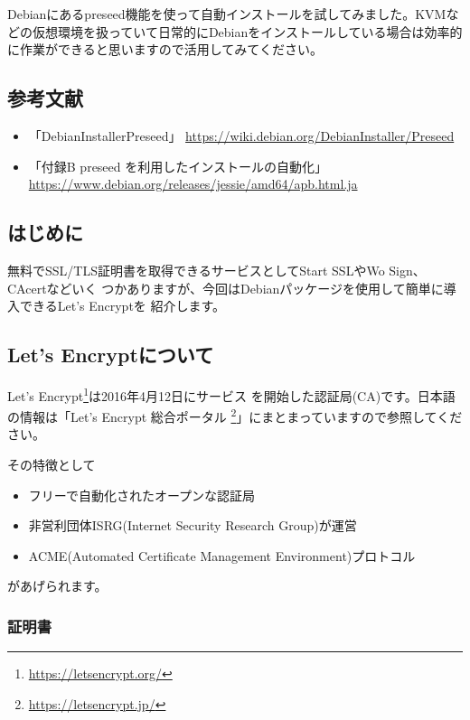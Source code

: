 \documentclass[mingoth,a4paper]{jsarticle}
\begin{document}
Debianにあるpreseed機能を使って自動インストールを試してみました。KVMなどの仮想環境を扱っていて日常的にDebianをインストールしている場合は効率的に作業ができると思いますので活用してみてください。

\subsection{参考文献}

\begin{itemize}
\item 「DebianInstallerPreseed」 \url{https://wiki.debian.org/DebianInstaller/Preseed}
\item 「付録B preseed を利用したインストールの自動化」 \url{https://www.debian.org/releases/jessie/amd64/apb.html.ja}
\end{itemize}


\subsection{はじめに}

無料でSSL/TLS証明書を取得できるサービスとしてStart SSLやWo Sign、CAcertなどいく
つかありますが、今回はDebianパッケージを使用して簡単に導入できるLet's Encryptを
紹介します。


\subsection{Let's Encryptについて}

Let's Encrypt\footnote{\url{https://letsencrypt.org/}}は2016年4月12日にサービス
を開始した認証局(CA)です。日本語の情報は「Let's Encrypt 総合ポータル
\footnote{\url{https://letsencrypt.jp/}}」にまとまっていますので参照してください。

その特徴として
\begin{itemize}
\item フリーで自動化されたオープンな認証局
\item 非営利団体ISRG(Internet Security Research Group)が運営
\item ACME(Automated Certificate Management Environment)プロトコル
\end{itemize}
があげられます。

\subsubsection{証明書}
\end{document}
